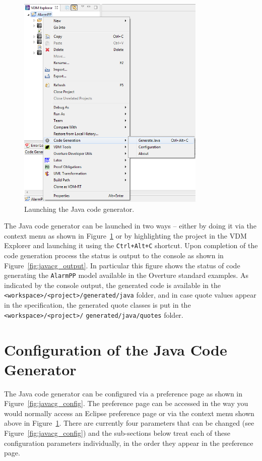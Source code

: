 \documentclass{overturerepchap}
\begin{document}
\begin{figure}[htbp]
\begin{center}
\includegraphics[width=9cm]{screenDumps/javacg_menu}
\caption{Launching the Java code generator.\label{fig:javacg_menu}}
\end{center}
\end{figure}

The Java code generator can be launched in two ways -- either by doing it via the context menu as shown in Figure~\ref{fig:javacg_menu} or by highlighting the project in the VDM Explorer and launching it using the \texttt{Ctrl+Alt+C} shortcut. Upon completion of the code generation process the status is output to the console as shown in Figure~\ref{fig:javacg_output}. In particular this figure shows the status of code generating the \texttt{AlarmPP} model available in the Overture standard examples. As indicated by the console output, the generated code is available in the \texttt{<workspace>/<project>/generated/java} folder, and in case quote values appear in the specification, the generated quote classes is put in the \texttt{<workspace>/<project>/} \texttt{generated/java/quotes} folder.

\section{Configuration of the Java Code Generator}

The Java code generator can be configured via a preference page as shown in Figure~\ref{fig:javacg_config}. The preference page can be accessed in the way you would normally access an Eclipse preference page or via the context menu shown above in Figure~\ref{fig:javacg_menu}. There are currently four parameters that can be changed (see Figure~\ref{fig:javacg_config}) and the sub-sections below treat each of these configuration parameters individually, in the order they appear in the preference page.
\end{document}
